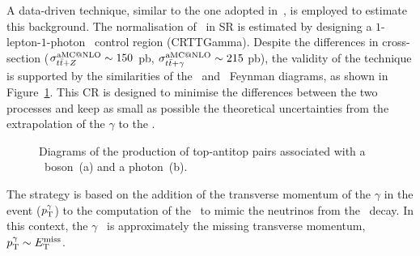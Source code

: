 		A data-driven technique, similar to the one adopted in~\cite{stop1L}, is employed to estimate this background. The normalisation of \ttZ\ in \ac{SR} is estimated by designing a $1$-lepton-$1$-photon \ttgamma\ control region (CRTTGamma). Despite the differences in cross-section ($\sigma_{t\bar{t}+Z}^{\mathrm{aMC@NLO}} \sim 150$ pb, $\sigma_{t\bar{t}+\gamma}^{\mathrm{aMC@NLO}} \sim 215$ pb), the validity of the technique is supported by the similarities of the \ttZ\ and \ttgamma\ Feynman diagrams, as shown in Figure~\ref{fig:ttZttGamma}. This \ac{CR} is designed to minimise the differences between the two processes and keep as small as possible the theoretical uncertainties from the extrapolation of the $\gamma$ to the \Zboson. 

		\begin{figure}[htpb]
		  \centering
		    \caption{Diagrams of the production of top-antitop pairs associated with a \Zboson\ boson~(a) and a photon~(b).}
		    \label{fig:ttZttGamma}
		\end{figure}

		The strategy is based on the addition of the transverse momentum of the $\gamma$ in the event ($p_{\mathrm{T}}^{\gamma}$) to the computation of the \met\ to mimic the neutrinos from the \Zboson\ decay. In this context, the $\gamma$ \pt\ is approximately the missing transverse momentum, $p_{\mathrm{T}}^{\gamma} \sim E_{\mathrm{T}}^{\mathrm{miss}}$. 

